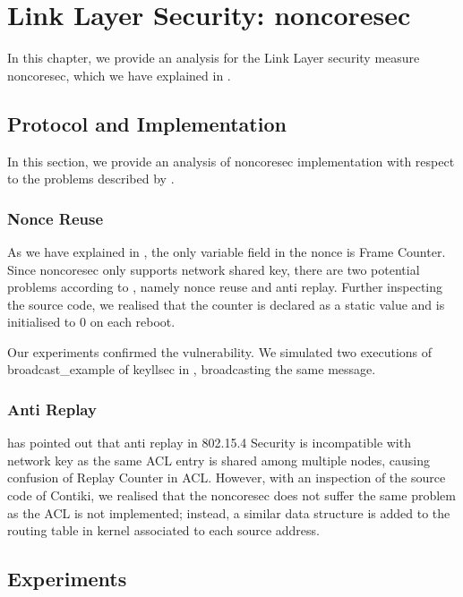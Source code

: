 \chapter{Link Layer Security: noncoresec} \label{Chp: LLSEC}

In this chapter, we provide an analysis for the Link Layer security measure noncoresec, which we have explained in .

\section{Protocol and Implementation}
In this section, we provide an analysis of noncoresec implementation with respect to the problems described by \cite{802154sec}. 

\subsection{Nonce Reuse}

As we have explained in , the only variable field in the nonce is Frame Counter. Since noncoresec only supports network shared key, there are two potential problems according to \cite{802154sec}, namely nonce reuse and anti replay. Further inspecting the source code, we realised that the counter is declared as a static value and is initialised to $0$ on each reboot.

Our experiments confirmed the vulnerability. We simulated two executions of  broadcast\_example of keyllsec in , broadcasting the same message. 

\subsection{Anti Replay}

\cite{802154sec} has pointed out that anti replay in 802.15.4 Security is incompatible with network key as the same ACL entry is shared among multiple nodes, causing confusion of Replay Counter in ACL. However, with an inspection of the source code of Contiki, we realised that the noncoresec does not suffer the same problem as the ACL is not implemented; instead, a similar data structure is added to the routing table in kernel  associated to each source address.%

\section{Experiments}

